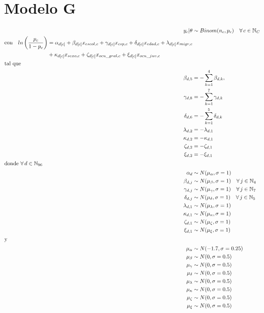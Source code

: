 \section{Modelo G}

\begin{align}\label{eq:Modelo_Comp_G}
y_c|\theta & \sim Binom(n_c,p_c) \quad \forall \, c \in \mathbb{N}_C \nonumber \\
\begin{split}
\text{con} \quad ln\left(\dfrac{p_c}{1-p_c}\right) &= \alpha_{d[c]} + \beta_{d[c]} x_{escol,c} + \gamma_{d[c]} x_{csp,c} + \delta_{d[c]} x_{edad,c} + \lambda_{d[c]} x_{migr,c} \\
&+ \kappa_{d[c]} x_{sexo,c} + \zeta_{d[c]} x_{ocu\_gral,c} + \xi_{d[c]} x_{ocu\_juv,c} 
\end{split}\\
\intertext{tal que} 
\beta_{d,5} &= -\sum\limits_{k = 1}^{4} \beta_{d,k}, \nonumber \\
\gamma_{d,8} &= -\sum\limits_{k = 1}^{7} \gamma_{d,k} \nonumber \\
\delta_{d,6} &= -\sum\limits_{k = 1}^{5} \delta_{d,k} \nonumber \\
\lambda_{d,2} &= -\lambda_{d,1} \nonumber \\
\kappa_{d,2} &= -\kappa_{d,1} \nonumber \\
\zeta_{d,2} &= -\zeta_{d,1} \nonumber \\
\xi_{d,2} &= -\xi_{d,1} \nonumber \\
\intertext{donde $\forall \, d \in \mathbb{N}_{96}$}
\alpha_d &\sim N(\mu_{\alpha}, \sigma=1) \quad  \nonumber \\
\beta_{d,j} &\sim N(\mu_{\beta}, \sigma=1) \quad \forall \, j \in \mathbb{N}_{4} \nonumber \\
\gamma_{d,j} &\sim N(\mu_{\gamma}, \sigma=1) \quad \forall \, j \in \mathbb{N}_{7} \nonumber \\
\delta_{d,j} &\sim N(\mu_{\delta}, \sigma=1) \quad \forall \, j \in \mathbb{N}_{5}  \nonumber \\ 
\lambda_{d,1} &\sim N(\mu_{\lambda}, \sigma=1) \nonumber \\
\kappa_{d,1} &\sim N(\mu_{\kappa}, \sigma=1) \nonumber \\ 
\zeta_{d,1} &\sim N(\mu_{\zeta}, \sigma=1) \nonumber \\
\xi_{d,1} &\sim N(\mu_{\xi}, \sigma=1) \nonumber \\
\intertext{y}
\mu_{\alpha} &\sim N(-1.7,\sigma=0.25) \nonumber \\
\mu_{\beta} &\sim N(0,\sigma=0.5) \nonumber \\
\mu_{\gamma} &\sim N(0,\sigma=0.5) \nonumber \\
\mu_{\delta} &\sim N(0,\sigma=0.5) \nonumber \\
\mu_{\lambda} &\sim N(0,\sigma=0.5) \nonumber \\
\mu_{\kappa} &\sim N(0,\sigma=0.5) \nonumber \\
\mu_{\zeta} &\sim N(0,\sigma=0.5) \nonumber \\
\mu_{\xi} &\sim N(0,\sigma=0.5) \nonumber
\end{align}


